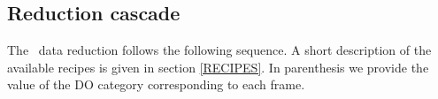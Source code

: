 \subsection{Reduction cascade} 


The \instname\, data reduction follows the following sequence. A short 
description of the available recipes is given in section \ref{RECIPES}.
In parenthesis we provide the value of the DO category corresponding to each 
frame.


    


